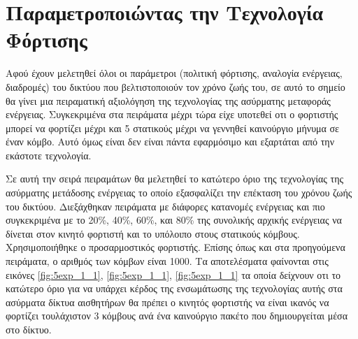 \section{Παραμετροποιώντας την Τεχνολογία Φόρτισης}\label{sc:result5}
Αφού έχουν μελετηθεί όλοι οι παράμετροι (πολιτική φόρτισης, αναλογία ενέργειας, διαδρομές) του δικτύου που βελτιστοποιούν τον χρόνο ζωής του, σε αυτό το σημείο
θα γίνει μια πειραματική αξιολόγηση της τεχνολογίας της ασύρματης μεταφοράς ενέργειας. Συγκεκριμένα στα πειράματα μέχρι τώρα είχε υποτεθεί οτι ο φορτιστής μπορεί να
φορτίζει μέχρι και 5 στατικούς μέχρι να γεννηθεί καινούργιο μήνυμα σε έναν κόμβο. Αυτό όμως είναι δεν είναι πάντα εφαρμόσιμο και εξαρτάται από την εκάστοτε
τεχνολογία.

Σε αυτή την σειρά πειραμάτων θα μελετηθεί το κατώτερο όριο της τεχνολογίας της ασύρματης μετάδοσης ενέργειας το οποίο εξασφαλίζει την επέκταση του χρόνου
ζωής του δικτύου. Διεξάχθηκαν πειράματα με διάφορες κατανομές ενέργειας και πιο συγκεκριμένα με το 20\%, 40\%, 60\%, και 80\% της συνολικής αρχικής
ενέργειας να δίνεται στον κινητό φορτιστή και το υπόλοιπο στους στατικούς κόμβους. Χρησιμοποιήθηκε ο προσαρμοστικός φορτιστής. Επίσης όπως και στα προηγούμενα
πειράματα, ο αριθμός των κόμβων είναι 1000. Τα αποτελέσματα φαίνονται στις εικόνες \ref{fig:5exp_1_1},  \ref{fig:5exp_1_1},  \ref{fig:5exp_1_1} τα οποία δείχνουν οτι
το κατώτερο όριο για να υπάρχει κέρδος της ενσωμάτωσης της τεχνολογίας αυτής στα ασύρματα δίκτυα αισθητήρων θα πρέπει ο κινητός φορτιστής να είναι ικανός να φορτίζει
τουλάχιστον 3 κόμβους ανά ένα καινούργιο πακέτο που δημιουργείται μέσα στο δίκτυο.



